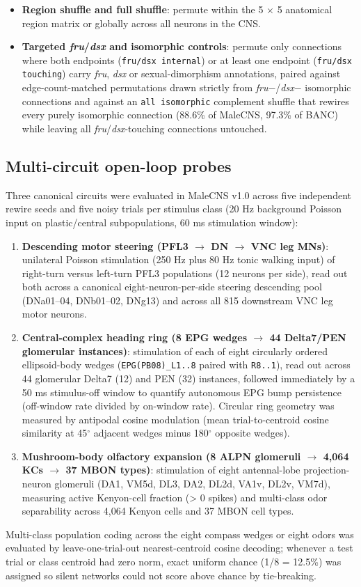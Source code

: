 \documentclass[11pt,a4paper]{article}
\begin{document}
\begin{itemize}
  \item \textbf{Region shuffle and full shuffle}: permute within the 5 $\times$ 5 anatomical region matrix or globally across all neurons in the CNS.
  \item \textbf{Targeted \emph{fru}/\emph{dsx} and isomorphic controls}: permute only connections where both endpoints (\texttt{fru/dsx internal}) or at least one endpoint (\texttt{fru/dsx touching}) carry \emph{fru}, \emph{dsx} or sexual-dimorphism annotations, paired against edge-count-matched permutations drawn strictly from \emph{fru}$-$/\emph{dsx}$-$ isomorphic connections and against an \texttt{all isomorphic} complement shuffle that rewires every purely isomorphic connection (88.6\% of MaleCNS, 97.3\% of BANC) while leaving all \emph{fru}/\emph{dsx}-touching connections untouched.
\end{itemize}
\subsection{Multi-circuit open-loop probes}
Three canonical circuits were evaluated in MaleCNS v1.0 across five independent rewire seeds and five noisy trials per stimulus class (20 Hz background Poisson input on plastic/central subpopulations, 60 ms stimulation window):

\begin{enumerate}
  \item \textbf{Descending motor steering (PFL3 $\rightarrow$ DN $\rightarrow$ VNC leg MNs)}: unilateral Poisson stimulation (250 Hz plus 80 Hz tonic walking input) of right-turn versus left-turn PFL3 populations (12 neurons per side), read out both across a canonical eight-neuron-per-side steering descending pool (DNa01--04, DNb01--02, DNg13) and across all 815 downstream VNC leg motor neurons.
  \item \textbf{Central-complex heading ring (8 EPG wedges $\rightarrow$ 44 Delta7/PEN glomerular instances)}: stimulation of each of eight circularly ordered ellipsoid-body wedges (\texttt{EPG(PB08)\_L1..8} paired with \texttt{R8..1}), read out across 44 glomerular Delta7 (12) and PEN (32) instances, followed immediately by a 50 ms stimulus-off window to quantify autonomous EPG bump persistence (off-window rate divided by on-window rate). Circular ring geometry was measured by antipodal cosine modulation (mean trial-to-centroid cosine similarity at 45$^{\circ}$ adjacent wedges minus 180$^{\circ}$ opposite wedges).
  \item \textbf{Mushroom-body olfactory expansion (8 ALPN glomeruli $\rightarrow$ 4,064 KCs $\rightarrow$ 37 MBON types)}: stimulation of eight antennal-lobe projection-neuron glomeruli (DA1, VM5d, DL3, DA2, DL2d, VA1v, DL2v, VM7d), measuring active Kenyon-cell fraction (> 0 spikes) and multi-class odor separability across 4,064 Kenyon cells and 37 MBON cell types.
\end{enumerate}
Multi-class population coding across the eight compass wedges or eight odors was evaluated by leave-one-trial-out nearest-centroid cosine decoding; whenever a test trial or class centroid had zero norm, exact uniform chance (1/8 = 12.5\%) was assigned so silent networks could not score above chance by tie-breaking.
\end{document}
